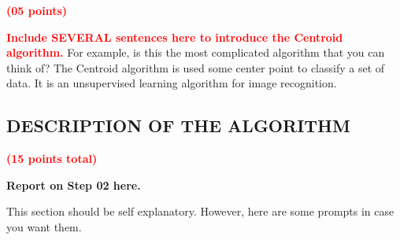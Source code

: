 \documentclass[dvipsnames,12pt]{article} %
\newcommand{\Brd}[1]{{\textbf{\textcolor{Red}{#1}}}}               %
\newcommand{\Brm}[1]{\textbf{\textcolor[rgb]{0.69,0.19,0.38}{#1}}} %
\begin{document}
      \Brd{(05 points)}

      \vspace{06pt}

      \Brd{Include SEVERAL sentences here to introduce the Centroid algorithm.}
      For example, is this the most complicated algorithm that you can think of?
    The Centroid algorithm is used some center point to classify a set of data. It is an unsupervised learning algorithm for image recognition. 
      \subsection{DESCRIPTION OF THE ALGORITHM}
        \label{SUBSECT 3.1:CENTROID DESCRIPTION}
        
        \Brd{(15 points total)}

        \Brm{Report on Step 02 here.}

          \vspace{06pt}

        This section should be self explanatory.
        However, here are some prompts in case you want them.



\end{document}

